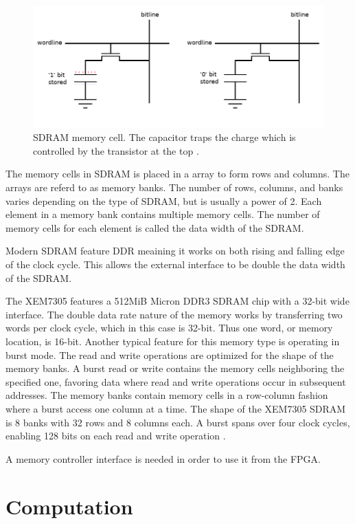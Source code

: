 \documentclass[12pt]{report}
\begin{document}
\begin{figure}[h]
    \centering
    \includegraphics[scale=0.4]{figures/DRAM.jpg}
    \caption{SDRAM memory cell. The capacitor traps the charge which is controlled by the transistor at the top \citep{SDRAMFLASH}.}
    \label{fig:7}
\end{figure}

The memory cells in SDRAM is placed in a array to form rows and columns. The arrays are referd to as memory banks. The number of rows, columns, and banks varies depending on the type of SDRAM, but is usually a power of 2. Each element in a memory bank contains multiple memory cells. The number of memory cells for each element is called the data width of the SDRAM.
\par
Modern SDRAM feature DDR meaining it works on both rising and falling edge of the clock cycle. This allows the external interface to be double the data width of the SDRAM.
\par
The XEM7305 features a 512MiB Micron DDR3 SDRAM chip with a 32-bit wide interface. The double data rate nature of the memory works by transferring two words per clock cycle, which in this case is 32-bit. Thus one word, or memory location, is 16-bit. Another typical feature for this memory type is operating in burst mode. The read and write operations are optimized for the shape of the memory banks. A burst read or write contains the memory cells neighboring the specified one, favoring data where read and write operations occur in subsequent addresses. The memory banks contain memory cells in a row-column fashion where a burst access one column at a time. The shape of the XEM7305 SDRAM is 8 banks with 32 rows and 8 columns each. A burst spans over four clock cycles, enabling 128 bits on each read and write operation \citep{XEM7305Man} \citep{MicronSDRAM}.

A memory controller interface is needed in order to use it from the FPGA.

\section{Computation}
\end{document}
